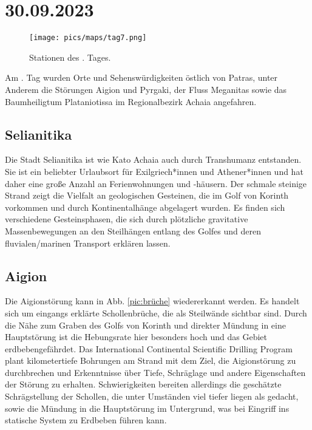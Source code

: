 \documentclass[preprint]{geomorphica} %
\begin{document}

\newpage

\section{30.09.2023}

\begin{figure}[!h]
    \centering
    \texttt{[image: pics/maps/tag7.png]}
    \caption{Stationen des \theday. Tages.}
    \label{pic:tag7}
\end{figure}

Am \theday. Tag wurden Orte und Sehenswürdigkeiten östlich von Patras, unter Anderem die Störungen Aigion und Pyrgaki, der Fluss Meganitas sowie das Baumheiligtum Plataniotissa im Regionalbezirk Achaia angefahren.

\subsection{Selianitika}

Die Stadt Selianitika ist wie Kato Achaia auch durch Transhumanz entstanden. Sie ist ein beliebter Urlaubsort für Exilgriech*innen und Athener*innen und hat daher eine große Anzahl an Ferienwohnungen und -häusern. Der schmale steinige Strand zeigt die Vielfalt an geologischen Gesteinen, die im Golf von Korinth vorkommen und durch Kontinentalhänge abgelagert wurden. Es finden sich verschiedene Gesteinsphasen, die sich durch plötzliche gravitative Massenbewegungen an den Steilhängen entlang des Golfes und deren fluvialen/marinen Transport erklären lassen. 

\subsection{Aigion}

Die Aigionstörung kann in Abb. \ref{pic:brüche} wiedererkannt werden. Es handelt sich um eingangs erklärte Schollenbrüche, die als Steilwände sichtbar sind. Durch die Nähe zum Graben des Golfs von Korinth und direkter Mündung in eine Hauptstörung ist die Hebungsrate hier besonders hoch und das Gebiet erdbebengefährdet. Das International Continental Scientific Drilling Program plant kilometertiefe Bohrungen am Strand mit dem Ziel, die Aigionstörung zu durchbrechen und Erkenntnisse über Tiefe, Schräglage und andere Eigenschaften der Störung zu erhalten. Schwierigkeiten bereiten allerdings die geschätzte Schrägstellung der Schollen, die unter Umständen viel tiefer liegen als gedacht, sowie die Mündung in die Hauptstörung im Untergrund, was bei Eingriff ins statische System zu Erdbeben führen kann. 
\end{document}
